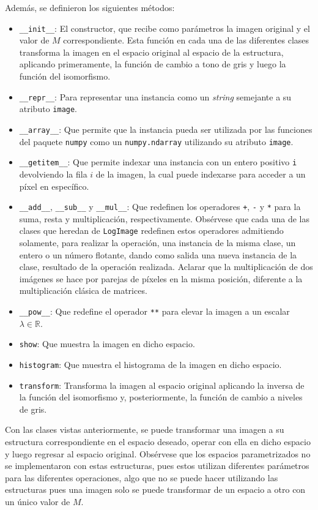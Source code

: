 Adem\'as, se definieron los siguientes m\'etodos:

\begin{itemize}
	\item \verb|__init__|: El constructor, que recibe como par\'ametros la imagen original y el valor de $M$ correspondiente. Esta funci\'on en cada una de las diferentes clases transforma la imagen en el espacio original al espacio de la estructura, aplicando primeramente, la funci\'on de cambio a tono de gris y luego la funci\'on del isomorfismo.
	\item \verb|__repr__|: Para representar una instancia como un \textit{string} semejante a su atributo \verb|image|.
	\item \verb|__array__|: Que permite que la instancia pueda ser utilizada por las funciones del paquete \verb|numpy| como un \verb|numpy.ndarray|  utilizando su atributo \verb|image|.
	\item \verb|__getitem__|: Que permite indexar una instancia con un entero positivo \verb|i| devolviendo la fila $i$ de la imagen, la cual puede indexarse para acceder a un p\'ixel en espec\'ifico.
	\item \verb|__add__|, \verb|__sub__| y \verb|__mul__|: Que redefinen los operadores \verb|+|, \verb|-| y \verb|*| para la suma, resta y multiplicaci\'on, respectivamente. Obs\'ervese que cada una de las clases que heredan de \verb|LogImage| redefinen estos operadores admitiendo solamente, para realizar la operaci\'on, una instancia de la misma clase, un entero o un n\'umero flotante, dando como salida una nueva instancia de la clase, resultado de la operaci\'on realizada. Aclarar que la multiplicaci\'on de dos im\'agenes se hace por parejas de p\'ixeles en la misma posici\'on, diferente a la multiplicaci\'on cl\'asica de matrices.
	\item \verb|__pow__|: Que redefine el operador \verb|**| para elevar la imagen a un escalar $\lambda\in \mathbb{R}$.
	\item \verb|show|: Que muestra la imagen en dicho espacio.
	\item \verb|histogram|: Que muestra el histograma de la imagen en dicho espacio.
	\item \verb|transform|: Transforma la imagen al espacio original aplicando la inversa de la funci\'on del isomorfismo y, posteriormente, la funci\'on de cambio a niveles de gris.
\end{itemize}

Con las clases vistas anteriormente, se puede transformar una imagen a su estructura correspondiente en el espacio deseado, operar con ella en dicho espacio y luego regresar al espacio original. Obs\'ervese que los espacios parametrizados no se implementaron con estas estructuras, pues estos utilizan diferentes par\'ametros para las diferentes operaciones, algo que no se puede hacer utilizando las estructuras pues una imagen solo se puede transformar de un espacio a otro con un \'unico valor de $M$.


